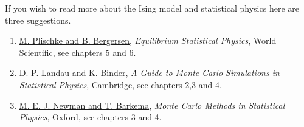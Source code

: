 \documentclass[%
oneside,                 %
final,                   %
10pt]{article}
\begin{document}
\noindent
If you wish to read more about the Ising model and statistical physics here are three suggestions.

\begin{enumerate}
\item \href{{http://www.worldscientific.com/worldscibooks/10.1142/5660}}{M. Plischke and B. Bergersen}, \emph{Equilibrium Statistical Physics}, World Scientific, see chapters 5 and 6.

\item \href{{http://www.cambridge.org/no/academic/subjects/physics/computational-science-and-modelling/guide-monte-carlo-simulations-statistical-physics-4th-edition?format=HB}}{D. P. Landau and K. Binder}, \emph{A Guide to Monte Carlo Simulations in Statistical Physics}, Cambridge, see chapters 2,3 and 4.

\item \href{{https://global.oup.com/academic/product/monte-carlo-methods-in-statistical-physics-9780198517979?cc=no&lang=en&}}{M. E. J. Newman and T. Barkema}, \emph{Monte Carlo Methods in Statistical Physics}, Oxford, see chapters 3 and 4.
\end{enumerate}

\noindent


\end{document}
